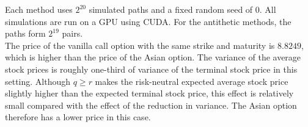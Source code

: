 \documentclass{article}
\begin{document}
\noindent Each method uses $2^{20}$ simulated paths and a fixed random seed of $0$. All simulations are run on a GPU using CUDA. For the antithetic methods, the paths form $2^{19}$ pairs. \\

The price of the vanilla call option with the same strike and maturity is $8.8249$, which is higher than the price of the Asian option. The variance of the average stock prices is roughly one-third of variance of the terminal stock price in this setting. Although $q\geq r$ makes the risk-neutral expected average stock price slightly higher than the expected terminal stock price, this effect is relatively small compared with the effect of the reduction in variance. The Asian option therefore has a lower price in this case.
\end{document}
